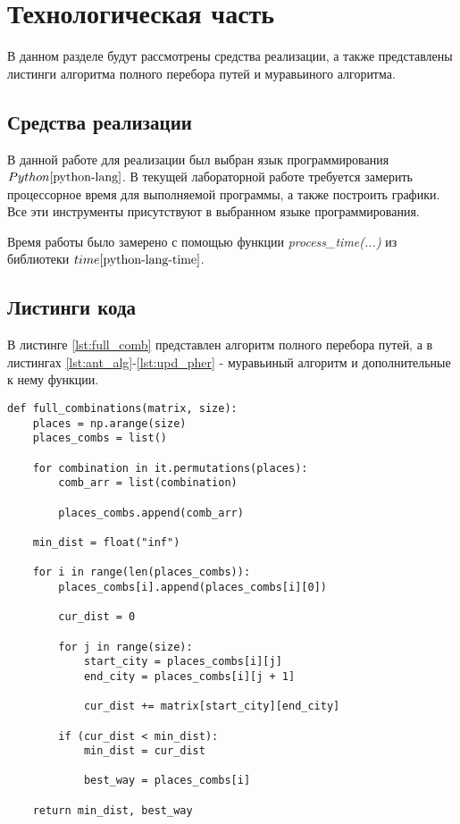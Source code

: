 \chapter{Технологическая часть}

В данном разделе будут рассмотрены средства реализации, а также представлены листинги алгоритма полного перебора путей и муравьиного алгоритма.

\section{Средства реализации}
В данной работе для реализации был выбран язык программирования $Python \cite{python-lang}$. В текущей лабораторной работе требуется замерить процессорное время для выполняемой программы, а также построить графики. Все эти инструменты присутствуют в выбранном языке программирования.

Время работы было замерено с помощью функции \textit{process\_time(...)} из библиотеки $time \cite{python-lang-time}$.


\section{Листинги кода}

В листинге \ref{lst:full_comb} представлен алгоритм полного перебора путей, а в листингах \ref{lst:ant_alg}-\ref{lst:upd_pher} - муравьиный алгоритм и дополнительные к нему функции.

\clearpage

\begin{center}
    \captionsetup{justification=raggedright,singlelinecheck=off}
    \begin{lstlisting}[label=lst:full_comb,caption=Алгоритм полного перебора путей]
def full_combinations(matrix, size):
	places = np.arange(size)
	places_combs = list()

	for combination in it.permutations(places):
		comb_arr = list(combination)

		places_combs.append(comb_arr)

	min_dist = float("inf")

	for i in range(len(places_combs)):
		places_combs[i].append(places_combs[i][0])

		cur_dist = 0

		for j in range(size):
			start_city = places_combs[i][j]
			end_city = places_combs[i][j + 1]

			cur_dist += matrix[start_city][end_city]

		if (cur_dist < min_dist):
			min_dist = cur_dist

			best_way = places_combs[i]

	return min_dist, best_way
\end{lstlisting}
\end{center}


